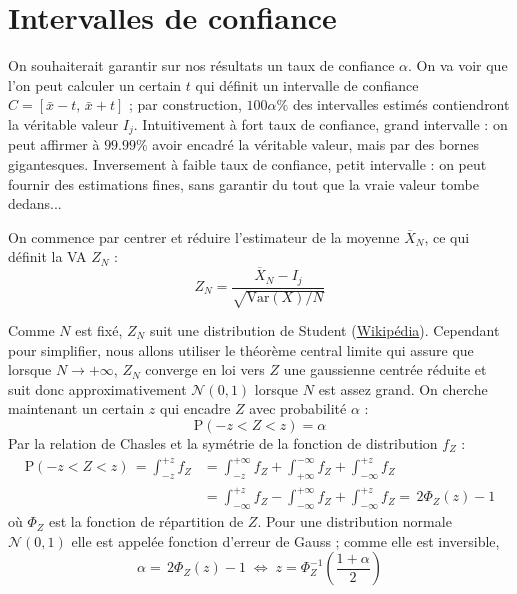 \documentclass{article}
\newcommand{\var}[1]{\mathrm{Var}(#1)}
\newcommand{\link}[2]{\href{#1}{\color[rgb]{0, 0, 1}#2}}
\begin{document}
\section{Intervalles de confiance}

On souhaiterait garantir sur nos résultats un taux de confiance $\alpha$.
On va voir que l'on peut calculer un certain $t$ qui définit un intervalle de confiance $C = [\bar{x} - t, \,\bar{x} + t]$ ; par construction, $100\alpha\%$ des intervalles estimés contiendront la véritable valeur $I_j$.
Intuitivement à fort taux de confiance, grand intervalle : on peut affirmer à $99.99\%$ avoir encadré la véritable valeur, mais par des bornes gigantesques.
Inversement à faible taux de confiance, petit intervalle : on peut fournir des estimations fines, sans garantir du tout que la vraie valeur tombe dedans...

On commence par centrer et réduire l'estimateur de la moyenne $\overline{X}_N$, ce qui définit la VA $Z_N$ :%
%
\begin{equation*}
    Z_N = \frac{\overline{X}_N - I_j}{\sqrt{\var{X}/N}}
\end{equation*}

\noindent Comme $N$ est fixé, $Z_N$ suit une distribution de Student (\link{https://en.wikipedia.org/wiki/Student\%27s_t-distribution}{Wikipédia}).
Cependant pour simplifier, nous allons utiliser le théorème central limite qui assure que lorsque $N \rightarrow +\infty$, $Z_N$ converge en loi vers $Z$ une gaussienne centrée réduite et suit donc approximativement $\mathcal{N}(0, 1)$ lorsque $N$ est assez grand.
On cherche maintenant un certain $z$ qui encadre $Z$ avec probabilité $\alpha$ :%
%
\begin{equation*}
    \mathrm{P}(-z < Z < z) = \alpha
\end{equation*}%
%
Par la relation de Chasles et la symétrie de la fonction de distribution $f_Z$ :%
%
\begin{equation*}
\begin{split}
    \mathrm{P}(-z < Z < z)\,
    = \int_{-z}^{+z} f_Z
   &= \int_{-z}^{+\infty} f_Z + \int_{+\infty}^{-\infty} f_Z + \int_{-\infty}^{+z} f_Z\\
   &= \int_{-\infty}^{+z} f_Z - \int_{-\infty}^{+\infty} f_Z + \int_{-\infty}^{+z} f_Z
    = \,2\Phi_Z(z) - 1
\end{split}
\end{equation*}%
%
où $\Phi_Z$ est la fonction de répartition de $Z$.
Pour une distribution normale $\mathcal{N}(0, 1)$ elle est appelée fonction d'erreur de Gauss ; comme elle est inversible,%
%
\begin{equation*}
    \alpha = \,2\Phi_Z(z) - 1
    \;\Leftrightarrow\;
    z = \Phi_Z^{-1}\left(\frac{1 + \alpha}{2}\right)
\end{equation*}
\end{document}

